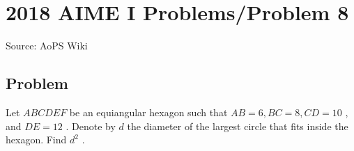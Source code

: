 \documentclass[12pt]{article}
\begin{document}
\section*{{2018 AIME I Problems/Problem 8}}
Source: AoPS Wiki

\subsection*{Problem}
Let $ABCDEF$ be an equiangular hexagon such that $AB=6, BC=8, CD=10$ , and $DE=12$ . Denote by $d$ the diameter of the largest circle that fits inside the hexagon. Find $d^2$ .
\end{document}
